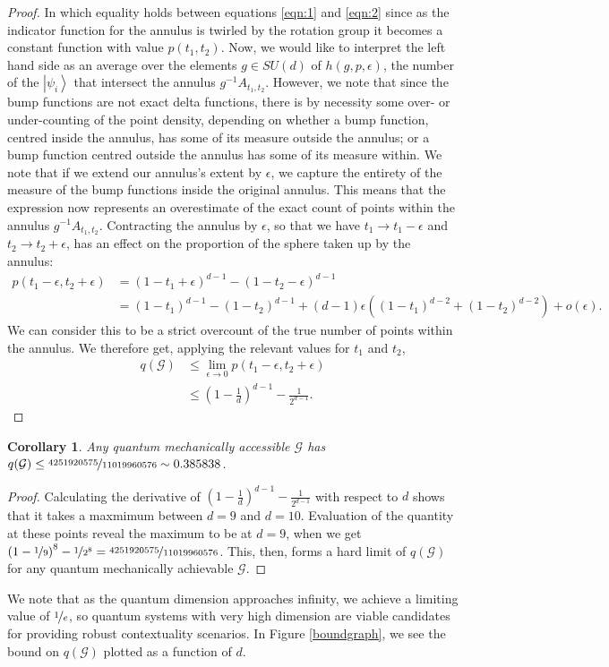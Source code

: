\documentclass{amsart}
\newtheorem{cor}{Corollary}
\theoremstyle{definition}
\newcommand{\ket}[1]{{\left\vert{#1}\right\rangle}}
\begin{document}
\begin{proof}
In which equality holds between equations \ref{eqn:1} and \ref{eqn:2} since as the indicator function for the annulus is twirled by the rotation group it becomes a constant function with value $p(t_1,t_2)$. Now, we would like to interpret the left hand side as an average over the elements $g\in SU(d)$ of $h(g,p,\epsilon)$, the number of the $\ket{\psi_i}$ that intersect the annulus $g^{-1}A_{t_1,t_2}$. However, we note that since the bump functions are not exact delta functions, there is by necessity some over- or under-counting of the point density, depending on whether a bump function, centred inside the annulus, has some of its measure outside the annulus; or a bump function centred outside the annulus has some of its measure within. We note that if we extend our annulus's extent by $\epsilon$, we capture the entirety of the measure of the bump functions inside the original annulus. This means that the expression now represents an overestimate of the exact count of points within the annulus $g^{-1}A_{t_1,t_2}$. Contracting the annulus by $\epsilon$, so that we have $t_1\rightarrow t_1-\epsilon$ and $t_2\rightarrow t_2+\epsilon$,  has an effect on the proportion of the sphere taken up by the annulus:
\begin{align}
p(t_1-\epsilon,t_2+\epsilon)&=\left(1-t_1+\epsilon\right)^{d-1}-\left(1-t_2-\epsilon\right)^{d-1}\\
&=(1-t_1)^{d-1}-(1-t_2)^{d-1}+(d-1)\epsilon\left((1-t_1)^{d-2}+(1-t_2)^{d-2}\right)+o(\epsilon).
\end{align}
We can consider this to be a strict overcount of the true number of points within the annulus. We therefore get, applying the relevant values for $t_1$ and $t_2$,
\begin{align}
q(\mathcal{G})&\leq \lim_{\epsilon\rightarrow0}p(t_1-\epsilon,t_2+\epsilon) \\
&\leq \left(1-\frac1d\right)^{d-1}-\frac{1}{2^{d-1}}.
\end{align}

\end{proof} 
\begin{cor}
Any quantum mechanically accessible $\mathcal{G}$ has  $q(\mathcal{G})\leq\nicefrac{4251920575}{11019960576}\sim0.385838$.
\end{cor}
\begin{proof}
Calculating the derivative of $ \left(1-\frac1d\right)^{d-1}-\frac{1}{2^{d-1}}$ with respect to $d$ shows that it takes a maxmimum between $d=9$ and $d=10$. Evaluation of the quantity at these points reveal the maximum to be at $d=9$, when we get $\left(1-\nicefrac19\right)^{8}-\nicefrac{1}{2^{8}}=\nicefrac{4251920575}{11019960576}$. This, then, forms a hard limit of $q(\mathcal{G})$ for any quantum mechanically achievable $\mathcal{G}$.
\end{proof}
We note that as the quantum dimension approaches infinity, we achieve a limiting value of $\nicefrac1e$, so quantum systems with very high dimension are viable candidates for providing robust contextuality scenarios. In Figure \ref{boundgraph}, we see the bound on $q(\mathcal{G})$ plotted as a function of $d$.
\end{document}
